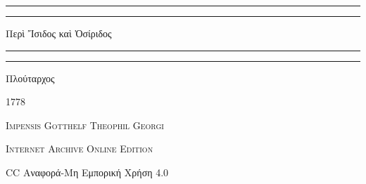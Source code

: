 \documentclass[a4paper, 11pt, oneside, polutonikogreek, german]{article}
\begin{document}
\begin{titlepage} %
	\centering %


	{\color{Red}\rule{\textwidth}{1.6pt}\vspace*{-\baselineskip}\vspace*{2pt}} %
	{\color{Red}\rule{\textwidth}{0.4pt}} %
	
	\vspace{1\baselineskip} %
	
	{\normalsize Περὶ Ἴσιδος καὶ Ὀσίριδος}
	
	\vspace{1\baselineskip} %

	{\color{Red}\rule{\textwidth}{0.4pt}\vspace*{-\baselineskip}\vspace{3.2pt}} %
	{\color{Red}\rule{\textwidth}{1.6pt}} %
	
	\vspace{1\baselineskip} %
	
	
	{\scriptsize Πλούταρχος}
 
        \vspace{0.5\baselineskip}
	
	\vspace*{1\baselineskip} %
	
        {\scshape \normalsize } %

        \vspace*{\fill}    

	\vspace{1\baselineskip}

	{\tiny\scshape 1778}
	
	{\tiny\scshape{Impensis Gotthelf Theophil Georgi}}
	
	\vspace{0.5\baselineskip} %

        {\scshape\tiny Internet Archive Online Edition}%
    
	{\tiny CC Αναφορά-Μη Εμπορική Χρήση 4.0} %
\end{titlepage}
\setlength{\parskip}{1mm plus1mm minus1mm}
\clearpage
\scriptsize
\end{document}

